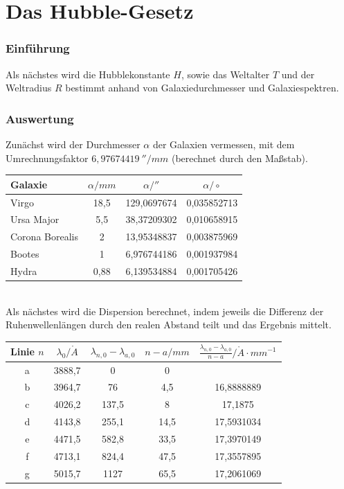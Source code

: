 \documentclass[12pt]{article}
\begin{document}
\section{Das Hubble-Gesetz}
\subsubsection*{Einführung}
Als nächstes wird die Hubblekonstante $H$, sowie das Weltalter $T$ und der Weltradius $R$ bestimmt anhand von Galaxiedurchmesser und Galaxiespektren.
\subsubsection*{Auswertung}
Zunächst wird der Durchmesser $\alpha$ der Galaxien vermessen, mit dem Umrechnungsfaktor $6,97674419\ ''/ mm$ (berechnet durch den Maßstab). 
\begin{table}[!ht]
    \centering
    \begin{tabular}{l|c|c|c}
        Galaxie & $\alpha / mm$ & $\alpha / ''$ & $\alpha / \circ$ \\ \hline    
        Virgo & 18,5 & 129,0697674 & 0,035852713 \\ 
        Ursa Major & 5,5 & 38,37209302 & 0,010658915 \\ 
        Corona Borealis & 2 & 13,95348837 & 0,003875969 \\ 
        Bootes & 1 & 6,976744186 & 0,001937984 \\ 
        Hydra & 0,88 & 6,139534884 & 0,001705426 \\ 
    \end{tabular}
\end{table}\\
Als nächstes wird die Dispersion berechnet, indem jeweils die Differenz der Ruhenwellenlängen durch den realen Abstand teilt und das Ergebnis mittelt.
\begin{table}[!ht]
    \centering
    \begin{tabular}{c|c|c|c|c}
    Linie $n$ & $\lambda_0 / \mathring{A}$ & $\lambda_{n, 0}- \lambda_{a, 0}$ & $n-a / mm$ & $\displaystyle\frac{\lambda_{n, 0}-\lambda_{a, 0}}{n-a}/\mathring{A} \cdot mm^{-1}$\\ \hline
        a & 3888,7 & 0 & 0 & ~ \\ 
        b & 3964,7 & 76 & 4,5 & 16,8888889 \\ 
        c & 4026,2 & 137,5 & 8 & 17,1875 \\ 
        d & 4143,8 & 255,1 & 14,5 & 17,5931034 \\ 
         e & 4471,5 & 582,8 & 33,5 & 17,3970149 \\ 
        f & 4713,1 & 824,4 & 47,5 & 17,3557895 \\
        g & 5015,7 & 1127 & 65,5 & 17,2061069 \\
    \end{tabular}
\end{table} \\
\end{document}

